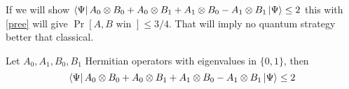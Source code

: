 If  we will show $\bra{\Psi} A_0\otimes B_0+A_0\otimes B_1+A_1\otimes B_0-A_1\otimes B_1 \ket{\Psi}\leq 2$ this with \ref{pree} will give $\Pr[ A,B \text{ win }]\leq 3/4$. That will imply  no quantum  strategy better that classical.
\begin{theorem}\label{therm3}
Let $A_0,A_1,B_0 ,B_1$ Hermitian operators with eigenvalues in $\{0,1\}$, then
\begin{equation}
\bra{\Psi} A_0\otimes B_0+A_0\otimes B_1+A_1\otimes B_0-A_1\otimes B_1 \ket{\Psi}\leq 2
\end{equation}
\end{theorem}

